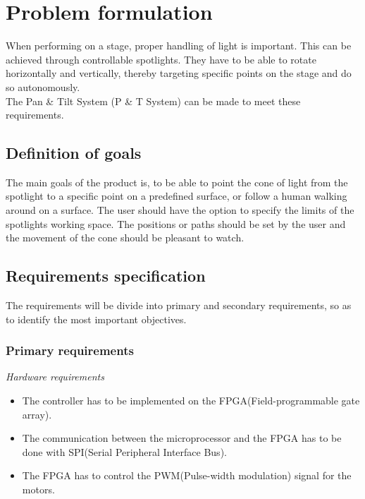\newpage

\section{Problem formulation}

When performing on a stage, proper handling of light is important. This can be achieved through controllable spotlights. They have to be able to rotate horizontally and vertically, thereby targeting specific points on the stage and do so autonomously.\\
The Pan \& Tilt System (P \& T System) can be made to meet these requirements.


\subsection{Definition of goals}
The main goals of the product is, to be able to point the cone of light from the spotlight to a specific point on a predefined surface, or follow a human walking around on a surface. The user should have the option to specify the limits of the spotlights working space. The positions or paths should be set by the user and the movement of the cone should be pleasant to watch.

\subsection{Requirements specification}
\label{sec:RequirementsSpecification}

The requirements will be divide into primary and secondary requirements, so as to identify the most important objectives.


\subsubsection{Primary requirements}
\label{sec:Primaryrequirements}

\textit{Hardware requirements}

\begin{itemize}

\item The controller has to be implemented on the FPGA(Field-programmable gate array).

\item The communication between the microprocessor and the FPGA has to be done with SPI(Serial Peripheral Interface Bus).

\item The FPGA has to control the PWM(Pulse-width modulation) signal for the motors.
\end{itemize}


